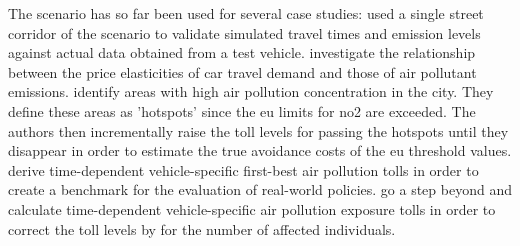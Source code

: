 The scenario has so far been used for several case studies:
%
\citet{HuelsmannEtAl_LAS_2011} used a single street corridor of the scenario to validate simulated travel times and emission levels against actual data obtained from a test vehicle.
%
\citet{KickhoeferEtAl_VanoutriveVerhetsel_2013} investigate the relationship between the price elasticities of car travel demand and those of air pollutant emissions.
%
\citet{HuelsmannEtAl_GerikeEtAl_2013} identify areas with high air pollution concentration in the city. They define these areas as 'hotspots' since the \gls{eu} limits for \gls{no2} are exceeded. The authors then incrementally raise the toll levels for passing the hotspots until they disappear in order to estimate the true avoidance costs of the \gls{eu} threshold values.
%
\citet{KickhoeferEtAl_NSE_2013} derive time-dependent vehicle-specific first-best air pollution tolls in order to create a benchmark for the evaluation of real-world policies.
%
\citet{KickhoeferKern_MobilTUM_2014} go a step beyond and calculate time-dependent vehicle-specific air pollution exposure tolls in order to correct the toll levels by \citet{KickhoeferEtAl_NSE_2013} for the number of affected individuals.




